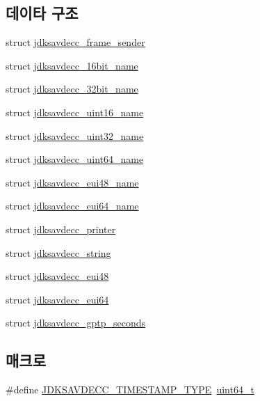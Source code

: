 \subsection*{데이타 구조}
\begin{DoxyCompactItemize}
\item 
struct \hyperlink{structjdksavdecc__frame__sender}{jdksavdecc\+\_\+frame\+\_\+sender}
\item 
struct \hyperlink{structjdksavdecc__16bit__name}{jdksavdecc\+\_\+16bit\+\_\+name}
\item 
struct \hyperlink{structjdksavdecc__32bit__name}{jdksavdecc\+\_\+32bit\+\_\+name}
\item 
struct \hyperlink{structjdksavdecc__uint16__name}{jdksavdecc\+\_\+uint16\+\_\+name}
\item 
struct \hyperlink{structjdksavdecc__uint32__name}{jdksavdecc\+\_\+uint32\+\_\+name}
\item 
struct \hyperlink{structjdksavdecc__uint64__name}{jdksavdecc\+\_\+uint64\+\_\+name}
\item 
struct \hyperlink{structjdksavdecc__eui48__name}{jdksavdecc\+\_\+eui48\+\_\+name}
\item 
struct \hyperlink{structjdksavdecc__eui64__name}{jdksavdecc\+\_\+eui64\+\_\+name}
\item 
struct \hyperlink{structjdksavdecc__printer}{jdksavdecc\+\_\+printer}
\item 
struct \hyperlink{structjdksavdecc__string}{jdksavdecc\+\_\+string}
\item 
struct \hyperlink{structjdksavdecc__eui48}{jdksavdecc\+\_\+eui48}
\item 
struct \hyperlink{structjdksavdecc__eui64}{jdksavdecc\+\_\+eui64}
\item 
struct \hyperlink{structjdksavdecc__gptp__seconds}{jdksavdecc\+\_\+gptp\+\_\+seconds}
\end{DoxyCompactItemize}
\subsection*{매크로}
\begin{DoxyCompactItemize}
\item 
\#define \hyperlink{group__util_gadd24ee5a8dde672bc6f9bdf27b8f481e}{J\+D\+K\+S\+A\+V\+D\+E\+C\+C\+\_\+\+T\+I\+M\+E\+S\+T\+A\+M\+P\+\_\+\+T\+Y\+PE}~\hyperlink{parse_8c_aec6fcb673ff035718c238c8c9d544c47}{uint64\+\_\+t}
\end{DoxyCompactItemize}
